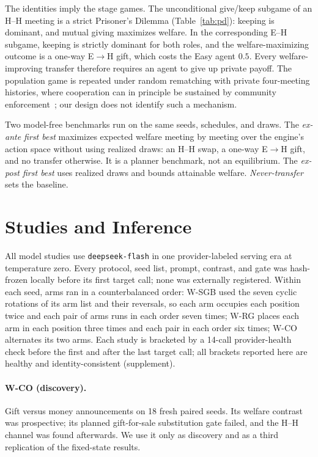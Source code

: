 \documentclass[sigconf,anonymous]{aamas}
\begin{document}
The identities imply the stage games.  The unconditional give\slash keep subgame of an
H--H meeting is a strict Prisoner's Dilemma (Table~\ref{tab:pd}): keeping is
dominant, and mutual giving maximizes welfare.  In the corresponding E--H
subgame, keeping is strictly dominant for both roles, and the welfare-maximizing
outcome is a one-way E$\rightarrow$H gift, which costs the Easy agent $0.5$.  Every welfare-improving
transfer therefore requires an agent to give up private payoff.  The population
game is repeated under random rematching with private four-meeting histories,
where cooperation can in principle be sustained by community
enforcement~\cite{kandori1992,ellison1994}; our design does not identify such a
mechanism.

Two model-free benchmarks run on the same seeds, schedules, and draws.  The
\emph{ex-ante first best} maximizes expected welfare meeting by meeting over the
engine's action space without using realized draws: an H--H swap, a one-way
E$\rightarrow$H gift, and no transfer otherwise.  It is a planner benchmark, not
an equilibrium.  The \emph{ex-post first best} uses realized draws and bounds
attainable welfare.  \emph{Never-transfer} sets the baseline.

\section{Studies and Inference}
\label{sec:design}

All model studies use \texttt{deepseek-flash} in one provider-labeled serving era
at temperature zero.  Every protocol, seed list, prompt, contrast, and gate was
hash-frozen locally before its first target call; none was externally
registered.  Within each seed, arms ran in a counterbalanced order: W-SGB used
the seven cyclic rotations of its arm list and their reversals, so each arm
occupies each position twice and each pair of arms runs in each order seven
times; W-RG places each arm in each position three times and each pair in each
order six times; W-CO alternates its two arms.  Each study is bracketed by a
14-call provider-health check before the first and after the last target call;
all brackets reported here are healthy and identity-consistent (supplement).

\paragraph{W-CO (discovery).}  Gift versus money announcements on 18 fresh
paired seeds.  Its welfare contrast was prospective; its planned
gift-for-sale substitution gate failed, and the H--H channel was found
afterwards.  We use it only as discovery and as a third replication of the
fixed-state results.
\end{document}
